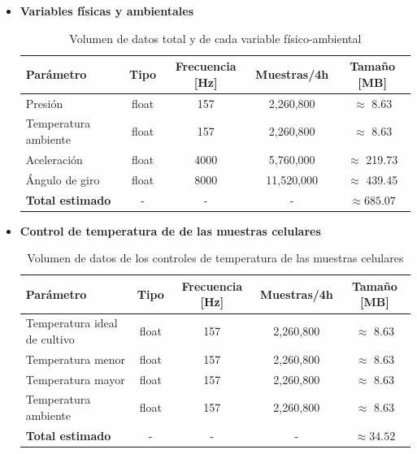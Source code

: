       \begin{itemize}

        \item \textbf{Variables físicas y ambientales}

        \begin{table}[H]
        \centering
        \begin{tabular}{|l|c|c|c|c|}
        \hline
        \textbf{Parámetro} & \textbf{Tipo} & \textbf{Frecuencia [Hz]} & \textbf{Muestras/4h} & \textbf{Tamaño [MB]} \\
        \hline
        Presión               & float & 157   & 2,260,800  & $\approx$ 8.63     \\
        Temperatura ambiente  & float & 157   & 2,260,800  & $\approx$ 8.63     \\
        Aceleración           & float & 4000  & 5,760,000  & $\approx$ 219.73   \\
        Ángulo de giro        & float & 8000  & 11,520,000 & $\approx$ 439.45   \\
        \hline
        \textbf{Total estimado} & -    & -     & -         & $\boldsymbol{\approx 685.07}$ \\
        \hline
        \end{tabular}
        \caption{Volumen de datos total y de cada variable físico-ambiental}
        \label{tab:volumen_datos}
        \end{table}

        \item \textbf{Control de temperatura de de las muestras celulares}

        \begin{table}[H]
        \centering
        \begin{tabular}{|l|c|c|c|c|}
        \hline
        \textbf{Parámetro} & \textbf{Tipo} & \textbf{Frecuencia [Hz]} & \textbf{Muestras/4h} & \textbf{Tamaño [MB]} \\
        \hline
        Temperatura ideal de cultivo & float & 157 & 2,260,800 & $\approx$ 8.63 \\
        Temperatura menor            & float & 157 & 2,260,800 & $\approx$ 8.63 \\
        Temperatura mayor            & float & 157 & 2,260,800 & $\approx$ 8.63 \\
        Temperatura ambiente         & float & 157 & 2,260,800 & $\approx$ 8.63 \\
        \hline
        \textbf{Total estimado}      & -     & -   & -         & $\boldsymbol{\approx 34.52}$ \\
        \hline
        \end{tabular}
        \caption{Volumen de datos de los controles de temperatura de las muestras celulares}
        \label{tab:volumen_datos_temperatura}
        \end{table}


\end{itemize}
